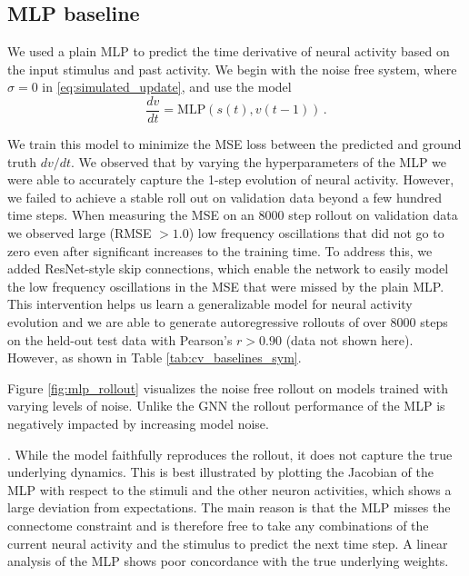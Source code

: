 \documentclass{article}
\begin{document}
\subsection{MLP baseline}

We used a plain MLP to predict the time derivative of neural activity based on the input stimulus and past activity. We begin with the noise free system, where $\sigma = 0$ in \ref{eq:simulated_update}, and use the model
\begin{equation}
    \frac{dv}{dt} = \mathrm{MLP}(s(t), v(t-1))\, .
\end{equation}

We train this model to minimize the MSE loss between the predicted and ground truth $dv/dt$. We observed that by varying the hyperparameters of the MLP we were able to accurately capture the 1-step evolution of neural activity. However, we failed to achieve a stable roll out on validation data beyond a few hundred time steps. When measuring the MSE on an 8000 step rollout on validation data we observed large (RMSE $> 1.0$) low frequency oscillations that did not go to zero even after significant increases to the training time. To address this, we added ResNet-style skip connections, which enable the network to easily model the low frequency oscillations in the MSE that were missed by the plain MLP. This intervention helps us learn a generalizable model for neural activity evolution and we are able to generate autoregressive rollouts of over 8000 steps on the held-out test data with Pearson's $r > 0.90$ (data not shown here). However, 
as shown in Table \ref{tab:cv_baselines_sym}. 

Figure \ref{fig:mlp_rollout} visualizes the noise free rollout on models trained with varying levels of noise. Unlike the GNN the rollout performance of the MLP is negatively impacted by increasing model noise. 

. While the model faithfully reproduces the rollout, it does not capture the true underlying dynamics. This is best illustrated by plotting the Jacobian of the MLP with respect to the stimuli and the other neuron activities, which shows a large deviation from expectations. The main reason is that the MLP misses the connectome constraint and is therefore free to take any combinations of the current neural activity and the stimulus to predict the next time step. A linear analysis of the MLP shows poor concordance with the true underlying weights.
\end{document}
